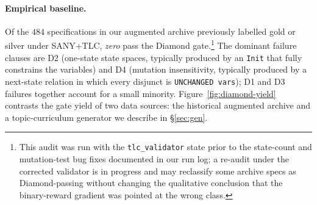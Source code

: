 \documentclass[11pt]{article}
\begin{document}
\paragraph{Empirical baseline.} Of the $484$ specifications in our
augmented archive previously labelled gold or silver under SANY+TLC,
\emph{zero} pass the Diamond gate.\footnote{This audit was run with the
\texttt{tlc\_validator} state prior to the state-count and mutation-test
bug fixes documented in our run log; a re-audit under the corrected
validator is in progress and may reclassify some archive specs as
Diamond-passing without changing the qualitative conclusion that the
binary-reward gradient was pointed at the wrong class.} The dominant
failure clauses are D2 (one-state state spaces, typically produced by
an \texttt{Init} that fully constrains the variables) and D4 (mutation
insensitivity, typically produced by a next-state relation in which
every disjunct is \texttt{UNCHANGED vars}); D1 and D3 failures together
account for a small minority. Figure~\ref{fig:diamond-yield} contrasts
the gate yield of two data sources: the historical augmented archive
and a topic-curriculum generator we describe in \S\ref{sec:gen}.
\end{document}
